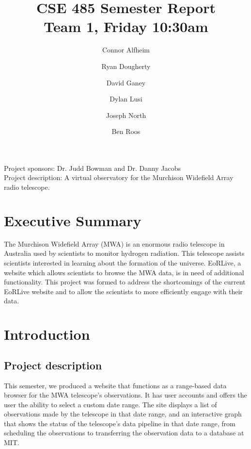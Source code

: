\documentclass[12pt]{article}
\begin{document}
\begin{spacing}{.4}
\setlength{\droptitle}{-7em}
\title{CSE 485 Semester Report \\  Team 1, Friday 10:30am}
\author{Connor Alfheim \and Ryan Dougherty \and David Ganey \and Dylan Lusi \and Joseph North \and Ben Roos}
\maketitle
\end{spacing}

\begin{spacing}{1.5}
\noindent
Project sponsors: Dr. Judd Bowman and Dr. Danny Jacobs \\
Project description: A virtual observatory for the Murchison Widefield Array radio telescope.
\newpage

\tableofcontents
\newpage

\section{Executive Summary}
The Murchison Widefield Array (MWA) is an enormous radio telescope in Australia used by scientists to monitor hydrogen radiation. This telescope assists scientists interested in learning about the formation of the universe. EoRLive, a website which allows scientists to browse the MWA data, is in need of additional functionality. This project was formed to address the shortcomings of the current EoRLive website and to allow the scientists to more efficiently engage with their data.

\section{Introduction}
\subsection{Project description}
This semester, we produced a website that functions as a range-based data browser for the MWA telescope's observations. It has user accounts and offers the user the ability to select a custom date range. The site displays a list of observations made by the telescope in that date range, and an interactive graph that shows the status of the telescope's data pipeline in that date range, from scheduling the observations to transferring the observation data to a database at MIT.

\end{spacing}
\end{document}
